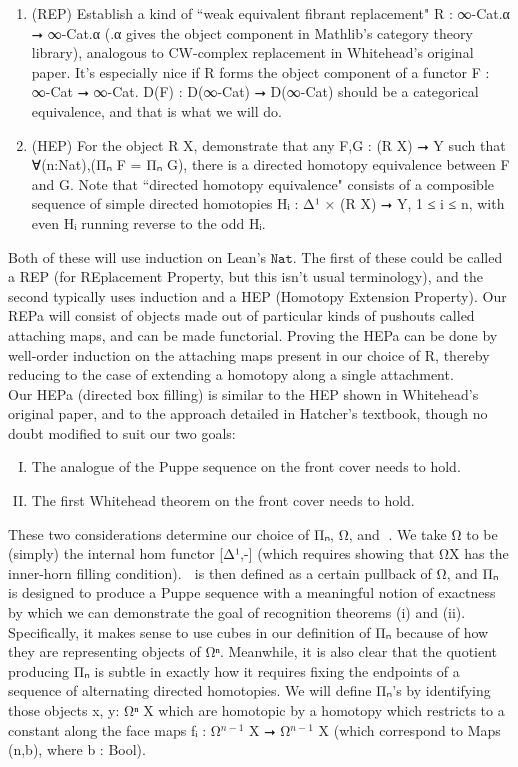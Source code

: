 \documentclass{book}
\theoremstyle{definition}
\begin{document}
\begin{enumerate}
\item (REP) Establish a kind of ``weak equivalent fibrant replacement" R : ∞-Cat.α ⭢ ∞-Cat.α (.α gives the object component in Mathlib's category theory library), analogous to CW-complex replacement in Whitehead's original paper. It's especially nice if R forms the object component of a functor F : ∞-Cat ⭢ ∞-Cat. D(F) : D(∞-Cat) ⭢ D(∞-Cat) should be a categorical equivalence, and that is what we will do.
\item (HEP) For the object R X, demonstrate that any F,G : (R X) ⭢ Y such that ∀(n:Nat),(Π⃗ₙ F = Π⃗ₙ G), there is a directed homotopy equivalence between F and G. Note that ``directed homotopy equivalence" consists of a composible sequence of simple directed homotopies Hᵢ : Δ¹ × (R X) ⭢ Y, 1 ≤ i ≤ n, with even Hᵢ running reverse to the odd Hᵢ.
\end{enumerate} 

Both of these will use induction on Lean's $\texttt{Nat}$. The first of these could be called a REP (for REplacement Property, but this isn't usual terminology), and the second typically uses induction and a HEP (Homotopy Extension Property). Our REPa will consist of objects made out of particular kinds of pushouts called attaching maps, and can be made functorial. Proving the HEPa can be done by well-order induction on the attaching maps present in our choice of R, thereby reducing to the case of extending a homotopy along a single attachment.\\

Our HEPa (directed box filling) is similar to the HEP shown in Whitehead's original paper, and to the approach detailed in Hatcher's textbook, though no doubt modified to suit our two goals:

\begin{enumerate}[(I)]
\item The analogue of the Puppe sequence on the front cover needs to hold.
\item The first Whitehead theorem on the front cover needs to hold.
\end{enumerate}

These two considerations determine our choice of Π⃗ₙ, Ω⃗, and ω⃗. We take Ω⃗ to be (simply) the internal hom functor [Δ¹,-] (which requires showing that Ω⃗X has the inner-horn filling condition). ω⃗ is then defined as a certain pullback of Ω⃗, and Π⃗ₙ is designed to produce a Puppe sequence with a meaningful notion of exactness by which we can demonstrate the goal of recognition theorems (i) and (ii). Specifically, it makes sense to use cubes in our definition of Π⃗ₙ because of how they are representing objects of Ω⃗ⁿ. Meanwhile, it is also clear that the quotient producing Π⃗ₙ is subtle in exactly how it requires fixing the endpoints of a sequence of alternating directed homotopies. We will define Π⃗ₙ's by identifying those objects x, y: Ω⃗ⁿ X which are homotopic by a homotopy which restricts to a constant along the face maps fᵢ : Ω⃗${}^{n-1}$ X ⭢ Ω⃗${}^{n-1}$ X (which correspond to Maps (n,b), where b : Bool).\\
\end{document}
